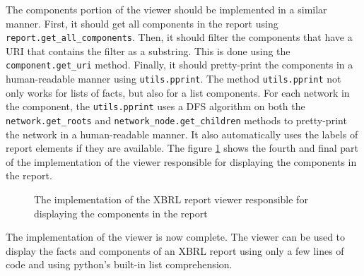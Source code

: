 The components portion of the viewer should be implemented in a similar manner.
First, it should get all components in the report using \texttt{report.get\_all\_components}.
Then, it should filter the components that have a URI that contains the filter as a substring.
This is done using the \texttt{component.get\_uri} method.
Finally, it should pretty-print the components in a human-readable manner using \texttt{utils.pprint}.
The method \texttt{utils.pprint} not only works for lists of facts, but also for a list components.
For each network in the component, the \texttt{utils.pprint} uses a DFS algorithm on both the
\texttt{network.get\_roots} and \texttt{network\_node.get\_children} methods to pretty-print the network in a human-readable manner.
It also automatically uses the labels of report elements if they are available.
The figure \ref{fig:viewer_4} shows the fourth and final part of the implementation of the viewer responsible for displaying the components in the report.

\begin{figure}[H]
    \centering
    \caption{The implementation of the XBRL report viewer responsible for displaying the components in the report}
    
    \label{fig:viewer_4}
\end{figure}

The implementation of the viewer is now complete.
The viewer can be used to display the facts and components of an XBRL report using only a few lines of code and using python's built-in list comprehension.



